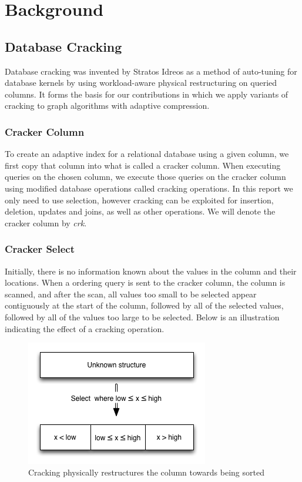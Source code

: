 \chapter{Background}

\label{ch:background}

\section{Database Cracking}

Database cracking was invented by Stratos Idreos as a method of auto-tuning for database kernels by using workload-aware physical restructuring on queried columns. It forms the basis for our contributions in which we apply variants of cracking to graph algorithms with adaptive compression.

\subsection{Cracker Column}

To create an adaptive index for a relational database using a given column, we first copy that column into what is called a cracker column. When executing queries on the chosen column, we execute those queries on the cracker column using modified database operations called cracking operations. In this report we only need to use selection, however cracking can be exploited for insertion, deletion, updates and joins, as well as other operations. We will denote the cracker column by \textit{crk}.

\subsection{Cracker Select}

Initially, there is no information known about the values in the column and their locations. When a ordering query is sent to the cracker column, the column is scanned, and after the scan, all values too small to be selected appear contiguously at the start of the column, followed by all of the selected values, followed by all of the values too large to be selected. Below is an illustration indicating the effect of a cracking operation.

\begin{figure}[h]
  \centering
  \includegraphics[]{images/d1_background_cracker_select}
  \caption{Cracking physically restructures the column towards being sorted}
  \label{fig:cracker_select_restructuring}
\end{figure}

